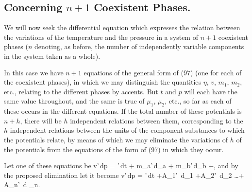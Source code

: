 \documentclass[12pt]{article}
\begin{document}
\subsection{Concerning $n +1$ Coexistent Phases.}
We will now seek the differential equation which expresses the relation between the variations of the temperature and the pressure in a system of $n + 1$ coexistent phases ($n$ denoting, as before, the number of independently variable components in the system taken as a whole). 


In this case we have  $n+1$ equations of the general form of (97) (one for each of the coexistent phases), in which we may distinguish the quantities $\eta$, $v$, $m_1$, $m_2$, etc., relating to the different phases by accents. But $t$ and $p$ will each have the same value throughout, and the same is true of $\mu_1$, $\mu_2$, etc., so far as each of these occurs in the different equations. If the total number of these potentials is $n+h$, there will be $h$ independent relations between them, corresponding to the $h$ independent relations between the units of the component substances to which the potentials relate, by means of which we may eliminate the variations of $h$ of the potentials from the equations of the form of (97) in which they occur.


Let one of these equations be
\eqs v'\,dp = \eta'\,dt + m_a'\,d\mu_a + m_b'\,d\mu_b +, \label{124}\eqe
and by the proposed elimination let it become
\eqs v'\,dp = \eta'\,dt +A_1' \,d\mu_1 +A_2' \,d\mu_2  \dots + A_n' \,d \mu_n.\label{125}\eqe
\end{document}
